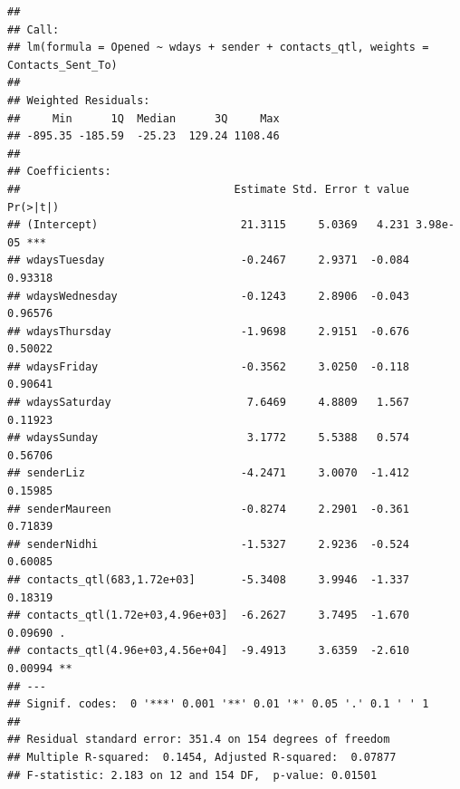 \documentclass[12pt, titlepage]{article}
\begin{document}
\begin{verbatim}
## 
## Call:
## lm(formula = Opened ~ wdays + sender + contacts_qtl, weights = Contacts_Sent_To)
## 
## Weighted Residuals:
##     Min      1Q  Median      3Q     Max 
## -895.35 -185.59  -25.23  129.24 1108.46 
## 
## Coefficients:
##                                 Estimate Std. Error t value Pr(>|t|)    
## (Intercept)                      21.3115     5.0369   4.231 3.98e-05 ***
## wdaysTuesday                     -0.2467     2.9371  -0.084  0.93318    
## wdaysWednesday                   -0.1243     2.8906  -0.043  0.96576    
## wdaysThursday                    -1.9698     2.9151  -0.676  0.50022    
## wdaysFriday                      -0.3562     3.0250  -0.118  0.90641    
## wdaysSaturday                     7.6469     4.8809   1.567  0.11923    
## wdaysSunday                       3.1772     5.5388   0.574  0.56706    
## senderLiz                        -4.2471     3.0070  -1.412  0.15985    
## senderMaureen                    -0.8274     2.2901  -0.361  0.71839    
## senderNidhi                      -1.5327     2.9236  -0.524  0.60085    
## contacts_qtl(683,1.72e+03]       -5.3408     3.9946  -1.337  0.18319    
## contacts_qtl(1.72e+03,4.96e+03]  -6.2627     3.7495  -1.670  0.09690 .  
## contacts_qtl(4.96e+03,4.56e+04]  -9.4913     3.6359  -2.610  0.00994 ** 
## ---
## Signif. codes:  0 '***' 0.001 '**' 0.01 '*' 0.05 '.' 0.1 ' ' 1
## 
## Residual standard error: 351.4 on 154 degrees of freedom
## Multiple R-squared:  0.1454, Adjusted R-squared:  0.07877 
## F-statistic: 2.183 on 12 and 154 DF,  p-value: 0.01501
\end{verbatim}
\end{document}
